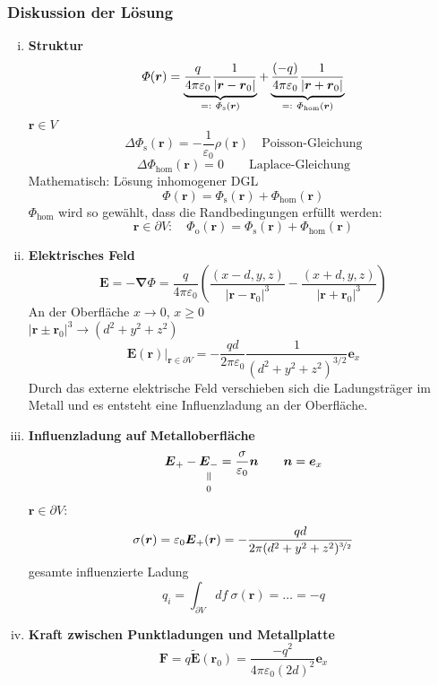 \documentclass[titlepage,11pt,a4paper,ngerman]{report}
\newcommand*{\eqdef}{=\mathrel{\vcenter{\baselineskip0.5ex \lineskiplimit0pt \hbox{\scriptsize.}\hbox{\scriptsize.}}}}
\newcommand{\tx}[1]{\textrm{#1}}
\newcommand{\verteq}{\rotatebox{90}{$\,=$}}
\newcommand{\equalto}[2]{\underset{\scriptstyle\overset{\mkern4mu\verteq}{#2}}{#1}}
\newcommand{\eofr}{\vec{E}(\vec{r})}
\newcommand{\pofr}{\Phi(\vec{r})}
\renewcommand{\Phi}{\varPhi}
\renewcommand{\vec}[1]{\boldsymbol{#1}}
\newcommand{\lcom}[1]{\color{MidnightBlue}#1\color{black}}
\renewcommand{\epsilon}{\varepsilon}
\begin{document}
\subsubsection{Diskussion der Lösung}
\begin{enumerate}[i)]
	\item \textbf{Struktur}
	$$\pofr = \underbrace{\frac{q}{4 \pi \epsilon_0} \frac{1}{|\vec{r}-\vec{r}_0|}}_{\eqdef\ \Phi_{\textrm{s}}(\vec{r})} + \underbrace{\frac{(-q)}{4 \pi \epsilon_0} \frac{1}{|\vec{r}+\vec{r}_0|}}_{\eqdef\ \Phi_{\textrm{hom}}(\vec{r})}$$ 
	$ \vec{r} \in V $
	\begin{equation*}
	\Delta \Phi_\tx{s}(\vec{r}) = - \frac{1}{\epsilon_0} \rho(\vec{r}) \quad \tx{Poisson-Gleichung}
	\end{equation*}
	\begin{equation*}
	\Delta \Phi_{\tx{hom}} (\vec{r}) = 0 \qquad \tx{Laplace-Gleichung}
	\end{equation*}
	Mathematisch: Lösung inhomogener DGL
	\begin{equation*}
	\pofr = \Phi_\tx{s}(\vec{r}) + \Phi_{\tx{hom}}(\vec{r})
	\end{equation*}
	$ \Phi_{\tx{hom}} $ wird so gewählt, dass die Randbedingungen erfüllt werden:
	\begin{equation*}
	\vec{r} \in \partial V: \quad \Phi_\tx{o} (\vec{r}) = \Phi_\tx{s}(\vec{r}) + \Phi_{\tx{hom}}(\vec{r})
	\end{equation*}
	\item \textbf{Elektrisches Feld}
	\begin{equation*}
	\vec{E} = - \vec{\nabla} \Phi = \frac{q}{4 \pi \epsilon_0} \left(\frac{(x-d,y,z)}{|\vec{r} - \vec{r}_0|^3} - \frac{(x+d,y,z)}{|\vec{r} + \vec{r}_0|^3}\right)
	\end{equation*}
	An der Oberfläche $ x \to 0 $, $ x \ge 0 $\\
	$ |\vec{r} \pm \vec{r}_0|^3 \rightarrow (d^2 + y^2 + z^2) $\\
	\begin{equation*}
	\eofr \bigg|_{\vec{r} \in \partial V} = - \frac{qd}{2 \pi \epsilon_0} \frac{1}{(d^2 + y^2 + z^2) ^{3/2}} \vec{e}_x
	\end{equation*}
	\lcom{Durch das externe elektrische Feld verschieben sich die Ladungsträger im Metall und es entsteht eine Influenzladung an der Oberfläche.}
	\item \textbf{Influenzladung auf Metalloberfläche}
	$$\vec{E}_+ - \equalto{\vec{E}_-}{0} = \frac{\sigma}{\epsilon_0} \vec{n} \qquad \vec{n} = \vec{e}_x$$
	$\vec{r} \in \partial V$:
	$$\sigma (\vec{r}) = \epsilon_0 \vec{E}_+(\vec{r}) = - \frac{qd}{2 \pi(d^2 + y^2 + z^2)^{\nicefrac{3}{2}}}$$
	gesamte influenzierte Ladung
	$$q_i = \int_{\partial V} df\ \sigma(\vec{r}) = \dots = -q$$
	\item \textbf{Kraft zwischen Punktladungen und Metallplatte}
	$$\vec{F} = q \vec{\tilde{E}}(\vec{r}_0) = \frac{-q^2}{4 \pi \epsilon_0 (2d)^2}\vec{e}_x$$
\end{enumerate}
\end{document}
